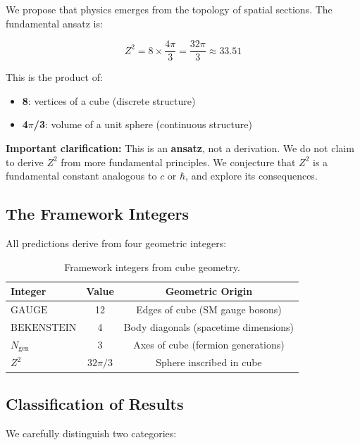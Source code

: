 \documentclass[12pt,a4paper]{article}
\newcommand{\Zsq}{Z^2}
\newcommand{\GAUGE}{\text{GAUGE}}
\newcommand{\BEKENSTEIN}{\text{BEKENSTEIN}}
\newcommand{\Ngen}{N_{\text{gen}}}
\begin{document}
We propose that physics emerges from the topology of spatial sections. The fundamental ansatz is:

\begin{equation}
\boxed{\Zsq = 8 \times \frac{4\pi}{3} = \frac{32\pi}{3} \approx 33.51}
\end{equation}

This is the product of:
\begin{itemize}
    \item \textbf{8}: vertices of a cube (discrete structure)
    \item \textbf{4$\pi$/3}: volume of a unit sphere (continuous structure)
\end{itemize}

\textbf{Important clarification:} This is an \textbf{ansatz}, not a derivation. We do not claim to derive $\Zsq$ from more fundamental principles. We conjecture that $\Zsq$ is a fundamental constant analogous to $c$ or $\hbar$, and explore its consequences.

\subsection{The Framework Integers}

All predictions derive from four geometric integers:

\begin{table}[H]
\centering
\begin{tabular}{lcc}
\toprule
\textbf{Integer} & \textbf{Value} & \textbf{Geometric Origin} \\
\midrule
$\GAUGE$ & 12 & Edges of cube (SM gauge bosons) \\
$\BEKENSTEIN$ & 4 & Body diagonals (spacetime dimensions) \\
$\Ngen$ & 3 & Axes of cube (fermion generations) \\
$\Zsq$ & $32\pi/3$ & Sphere inscribed in cube \\
\bottomrule
\end{tabular}
\caption{Framework integers from cube geometry.}
\label{tab:integers}
\end{table}

\subsection{Classification of Results}

We carefully distinguish two categories:
\end{document}
